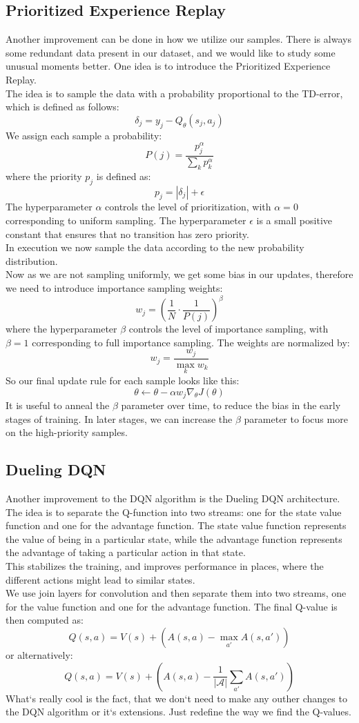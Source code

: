 \documentclass[a4paper,12pt]{article}
\begin{document}
\subsection{Prioritized Experience Replay}
Another improvement can be done in how we utilize our samples. There is always some redundant data present in our dataset, and we would like to study some unusual moments better. One idea is to introduce the Prioritized Experience Replay.
\\
The idea is to sample the data with a probability proportional to the TD-error, which is defined as follows:
\[
\delta_j = y_j - Q_\theta(s_j, a_j)
\]
We assign each sample a probability:
\[
P(j) = \frac{p_j^\alpha}{\sum_k p_k^\alpha}
\]
where the priority $p_j$ is defined as:
\[
p_j = |\delta_j| + \epsilon
\]
The hyperparameter $\alpha$ controls the level of prioritization, with $\alpha = 0$ corresponding to uniform sampling. The hyperparameter $\epsilon$ is a small positive constant that ensures that no transition has zero priority.
\\ In execution we now sample the data according to the new probability distribution.
\\ Now as we are not sampling uniformly, we get some bias in our updates, therefore we need to introduce importance sampling weights:
\[
w_j = \left( \frac{1}{N} \cdot \frac{1}{P(j)} \right)^\beta
\]
where the hyperparameter $\beta$ controls the level of importance sampling, with $\beta = 1$ corresponding to full importance sampling. The weights are normalized by:
\[
w_j = \frac{w_j}{\max_k w_k}
\]
So our final update rule for each sample looks like this:
\[
\theta \leftarrow \theta - \alpha w_j \nabla_\theta J(\theta)
\]
It is useful to anneal the $\beta$ parameter over time, to reduce the bias in the early stages of training. In later stages, we can increase the $\beta$ parameter to focus more on the high-priority samples.
\subsection{Dueling DQN}
Another improvement to the DQN algorithm is the Dueling DQN architecture. The idea is to separate the Q-function into two streams: one for the state value function and one for the advantage function. The state value function represents the value of being in a particular state, while the advantage function represents the advantage of taking a particular action in that state.
\\ This stabilizes the training, and improves performance in places, where the different actions might lead to similar states.
\\We use join layers for convolution and then separate them into two streams, one for the value function and one for the advantage function. The final Q-value is then computed as:
\[
Q(s, a) = V(s) + (A(s, a) - \max_{a'} A(s, a'))
\]
or alternatively:
\[
Q(s, a) = V(s) + (A(s, a) - \frac{1}{|\mathcal{A}|} \sum_{a'} A(s, a'))
\]
What`s really cool is the fact, that we don`t need to make any outher changes to the DQN algorithm or it`s extensions. Just redefine the way we find the Q-values.
\end{document}
